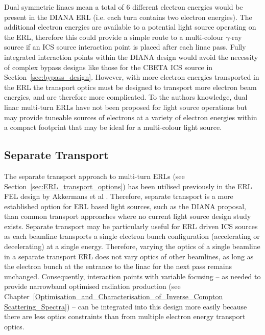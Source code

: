 \documentclass[../main.tex]{subfiles}
\begin{document}
Dual symmetric linacs mean a total of 6 different electron energies would be present in the DIANA ERL (i.e. each turn contains two electron energies). The additional electron energies are available to a potential light source operating on the ERL, therefore this could provide a simple route to a multi-colour $\gamma$-ray source if an ICS source interaction point is placed after each linac pass. Fully integrated interaction points within the DIANA design would avoid the necessity of complex bypass designs like those for the CBETA ICS source in Section~\ref{sec:bypass_design}. However, with more electron energies transported in the ERL the transport optics must be designed to transport more electron beam energies, and are therefore more complicated. To the authors knowledge, dual linac multi-turn ERLs have not been proposed for light source operations but may provide tuneable sources of electrons at a variety of electron energies within a compact footprint that may be ideal for a multi-colour light source.

\subsection{Separate Transport}

The separate transport approach to multi-turn ERLs (see Section~\ref{sec:ERL_transport_options}) has been utilised previously in the ERL FEL design by Akkermans et al \cite{akkermans2017compact}. Therefore, separate transport is a more established option for ERL based light sources, such as the DIANA proposal, than common transport approaches where no current light source design study exists. Separate transport may be particularly useful for ERL driven ICS sources as each beamline transports a single electron bunch configuration (accelerating or decelerating) at a single energy. Therefore, varying the optics of a single beamline in a separate transport ERL does not vary optics of other beamlines, as long as the electron bunch at the entrance to the linac for the next pass remains unchanged. Consequently, interaction points with variable focusing -- as needed to provide narrowband optimised radiation production (see Chapter~\ref{Optimisation_and_Characterisation_of_Inverse_Compton Scattering_Spectra}) -- can be integrated into this design more easily because there are less optics constraints than from multiple electron energy transport optics.
\end{document}
